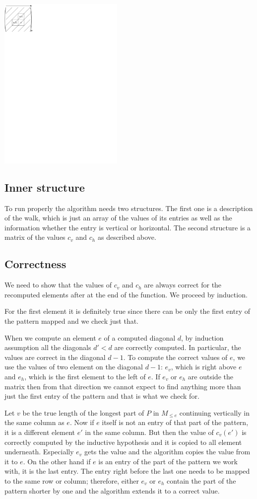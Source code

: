 \centerline{\mbox{\includegraphics[width=60mm]{../img/walking_alg.pdf}}}

\subsection{Inner structure}
To run properly the algorithm needs two structures. The first one is a description of the walk, which is just an array of the values of its entries as well as the information whether the entry is vertical or horizontal. The second structure is a matrix of the values $c_v$ and $c_h$ as described above.

\subsection{Correctness}
We need to show that the values of $c_v$ and $c_h$ are always correct for the recomputed elements after at the end of the function. We proceed by induction.

For the first element it is definitely true since there can be only the first entry of the pattern mapped and we check just that.

When we compute an element $e$ of a computed diagonal $d$, by induction assumption all the diagonals $d'<d$ are correctly computed. In particular, the values are correct in the diagonal $d-1$. To compute the correct values of $e$, we use the values of two element on the diagonal $d-1$: $e_v$, which is right above $e$ and $e_h$, which is the first element to the left of $e$. If $e_v$ or $e_h$ are outside the matrix then from that direction we cannot expect to find anything more than just the first entry of the pattern and that is what we check for.

Let $v$ be the true length of the longest part of $P$ in $M_{\leq e}$ continuing vertically in the same column as $e$. Now if $e$ itself is not an entry of that part of the pattern, it is a different element $e'$ in the same column. But then the value of $c_v(e')$ is correctly computed by the inductive hypothesis and it is copied to all element underneath. Especially $e_v$ gets the value and the algorithm copies the value from it to $e$. On the other hand if $e$ is an entry of the part of the pattern we work with, it is the last entry. The entry right before the last one needs to be mapped to the same row or column; therefore, either $e_v$ or $e_h$ contain the part of the pattern shorter by one and the algorithm extends it to a correct value.

